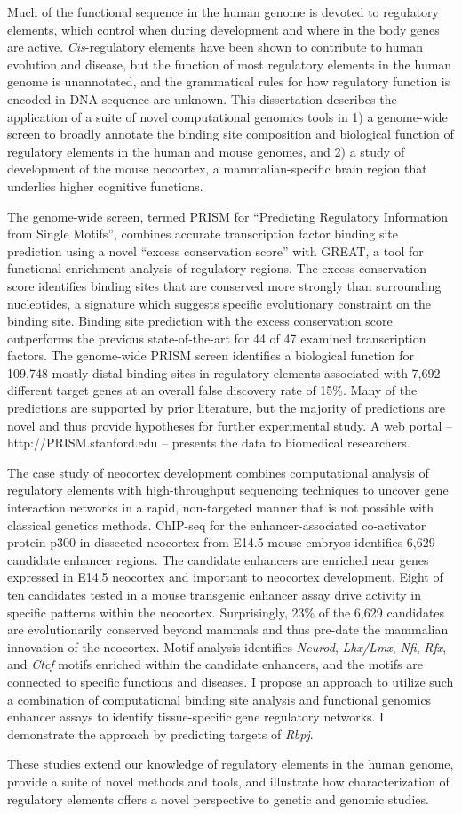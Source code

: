Much of the functional sequence in the human genome is devoted to
regulatory elements, which control when during development and where in
the body genes are active.  \textit{Cis}-regulatory elements have been shown to
contribute to human evolution and disease, but the function of most regulatory elements in
the human genome is unannotated, and the grammatical rules for how regulatory
function is encoded in DNA sequence are unknown.  This dissertation
describes the application of a suite of novel computational genomics tools
in 1) a genome-wide screen to broadly annotate the
binding site composition and biological function of regulatory elements in the human and
mouse genomes, and 2) a study of development of the mouse
neocortex, a mammalian-specific brain region that underlies higher cognitive functions.
%

The genome-wide screen, termed PRISM for ``Predicting Regulatory Information
from Single Motifs'', combines accurate transcription factor
binding site prediction using a novel ``excess conservation score'' with
GREAT, a tool for functional enrichment analysis of regulatory regions.  The
excess conservation score identifies binding sites that are conserved more
strongly than surrounding nucleotides, a signature which suggests specific
evolutionary constraint on the binding site.  Binding site prediction with
the excess conservation score outperforms the previous state-of-the-art for
44 of 47 examined transcription factors.  The genome-wide PRISM screen identifies a biological function
for 109,748 mostly distal binding sites in regulatory elements associated with 7,692
different target genes at an overall false discovery rate of 15\%.  Many of
the predictions are supported by prior literature, but the majority of predictions
are novel and thus provide hypotheses for further experimental study.  A web
portal -- http://PRISM.stanford.edu -- presents the data to biomedical researchers.
%

The case study of neocortex development combines computational analysis of
regulatory elements with high-throughput sequencing techniques to uncover
gene interaction networks in a rapid, non-targeted manner that is not
possible with classical genetics methods.  ChIP-seq for the enhancer-associated
co-activator protein p300 in dissected neocortex from E14.5 mouse embryos
identifies 6,629 candidate enhancer regions.  The candidate enhancers are
enriched near genes expressed in E14.5 neocortex and important to neocortex development.
Eight of ten candidates tested in a mouse transgenic enhancer assay drive activity in
specific patterns within the neocortex.  Surprisingly, 23\% of the 6,629 candidates
are evolutionarily conserved beyond mammals and thus pre-date the mammalian innovation of
the neocortex.  Motif analysis identifies \textit{Neurod}, \textit{Lhx/Lmx}, \textit{Nfi},
\textit{Rfx}, and \textit{Ctcf}
motifs enriched within the candidate enhancers, and the motifs are connected to specific
functions and diseases.  I propose an approach to utilize such a combination of
computational binding site analysis and functional genomics enhancer assays
to identify tissue-specific gene regulatory networks.  I demonstrate the approach by
predicting targets of \textit{Rbpj}.
%

These studies extend our knowledge of regulatory elements in the human genome, provide a suite
of novel methods and tools, and illustrate how
characterization of regulatory elements offers a novel perspective to genetic and genomic studies.
